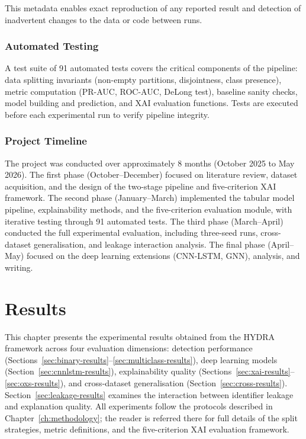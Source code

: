 \documentclass[12pt,a4paper]{report}
\begin{document}
This metadata enables exact reproduction of any reported result and detection of inadvertent changes to the data or code between runs.

\subsection{Automated Testing}
\label{sec:testing}

A test suite of 91 automated tests covers the critical components of the pipeline: data splitting invariants (non-empty partitions, disjointness, class presence), metric computation (PR-AUC, ROC-AUC, DeLong test), baseline sanity checks, model building and prediction, and XAI evaluation functions. Tests are executed before each experimental run to verify pipeline integrity.

\subsection{Project Timeline}
\label{sec:timeline}

The project was conducted over approximately 8 months (October 2025 to May 2026). The first phase (October--December) focused on literature review, dataset acquisition, and the design of the two-stage pipeline and five-criterion XAI framework. The second phase (January--March) implemented the tabular model pipeline, explainability methods, and the five-criterion evaluation module, with iterative testing through 91 automated tests. The third phase (March--April) conducted the full experimental evaluation, including three-seed runs, cross-dataset generalisation, and leakage interaction analysis. The final phase (April--May) focused on the deep learning extensions (CNN-LSTM, GNN), analysis, and writing.

\chapter{Results}
\label{ch:results}

This chapter presents the experimental results obtained from the HYDRA framework across four evaluation dimensions: detection performance (Sections~\ref{sec:binary-results}--\ref{sec:multiclass-results}), deep learning models (Section~\ref{sec:cnnlstm-results}), explainability quality (Sections~\ref{sec:xai-results}--\ref{sec:oxs-results}), and cross-dataset generalisation (Section~\ref{sec:cross-results}). Section~\ref{sec:leakage-results} examines the interaction between identifier leakage and explanation quality. All experiments follow the protocols described in Chapter~\ref{ch:methodology}; the reader is referred there for full details of the split strategies, metric definitions, and the five-criterion XAI evaluation framework.
\end{document}
